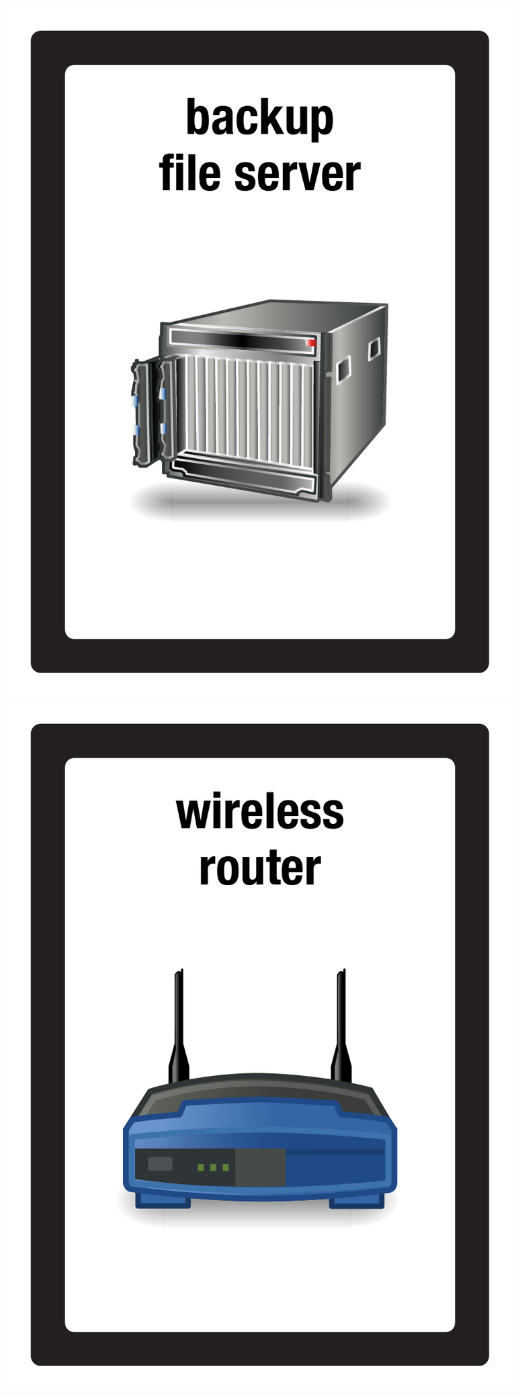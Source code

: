 \documentclass{letter}
\begin{document}
\includegraphics{patch/patch_backup_file_server}
\includegraphics{patch/patch_wireles_router}
\end{document}
